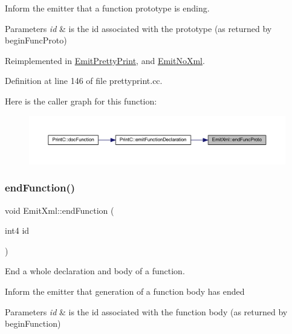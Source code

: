 Inform the emitter that a function prototype is ending. 
\begin{DoxyParams}{Parameters}
{\em id} & is the id associated with the prototype (as returned by begin\+Func\+Proto) \\
\hline
\end{DoxyParams}


Reimplemented in \mbox{\hyperlink{class_emit_pretty_print_a4eac637afa829305fb6cda48ed09bcbb}{Emit\+Pretty\+Print}}, and \mbox{\hyperlink{class_emit_no_xml_ae874ec5e673fd74f9770f90212a4e451}{Emit\+No\+Xml}}.



Definition at line 146 of file prettyprint.\+cc.

Here is the caller graph for this function\+:
\nopagebreak
\begin{figure}[H]
\begin{center}
\leavevmode
\includegraphics[width=350pt]{class_emit_xml_a0c1fad40b58e0a977f69ed80fb6f3bc8_icgraph}
\end{center}
\end{figure}
\mbox{\label{class_emit_xml_ac1cfefc98a7cfbfa0c479cac8a1e2a71}} 
\subsubsection{\texorpdfstring{endFunction()}{endFunction()}}
{\footnotesize\ttfamily void Emit\+Xml\+::end\+Function (\begin{DoxyParamCaption}\item[{int4}]{id }\end{DoxyParamCaption})\hspace{0.3cm}{\ttfamily [virtual]}}



End a whole declaration and body of a function. 

Inform the emitter that generation of a function body has ended 
\begin{DoxyParams}{Parameters}
{\em id} & is the id associated with the function body (as returned by begin\+Function) \\
\hline
\end{DoxyParams}


